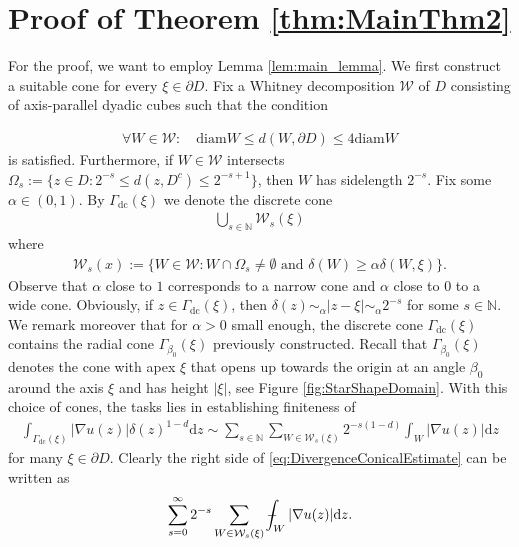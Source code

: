 \documentclass[a4paper,12pt]{article}
\theoremstyle{definition}
\theoremstyle{definition}
\def\Xint#1{\mathchoice
	{\XXint\displaystyle\textstyle{#1}}%
	{\XXint\textstyle\scriptstyle{#1}}%
	{\XXint\scriptstyle\scriptscriptstyle{#1}}%
	{\XXint\scriptscriptstyle\scriptscriptstyle{#1}}%
	\!\int}
\def\XXint#1#2#3{{\setbox0=\hbox{$#1{#2#3}{\int}$ }
		\vcenter{\hbox{$#2#3$ }}\kern-.568\wd0}}
\def\dashint{\Xint-}
\begin{document}
	\section{Proof of Theorem \ref{thm:MainThm2}}\label{sec:ConVar}
	For the proof, we want to employ Lemma \ref{lem:main_lemma}. We first construct a suitable cone for every $\xi\in\partial D$.  Fix a Whitney decomposition $\mathcal{W}$ of $D$ consisting of axis-parallel dyadic cubes such that the condition
	
	\begin{align}\label{eq:Whitney}
		\forall W\in\mathcal{W}:\quad \text{diam}W\leq d(W,\partial D)\leq 4\text{diam} W
	\end{align}
	is satisfied. Furthermore, if $W\in\mathcal{W}$ intersects $\Omega_s:=\lbrace z\in D:2^{-s}\leq d(z,D^c)\leq 2^{-s+1}\rbrace$, then $W$ has sidelength $2^{-s}$. Fix some  $\alpha\in(0,1)$. By $\Gamma_{\mathrm{dc}}(\xi)$ we denote the discrete cone
	\begin{align*}
		\bigcup_{s\in\mathbb N}\mathcal W_s(\xi)
	\end{align*}
	where
	\begin{align*}
		\mathcal{W}_s(x):=\lbrace W  \in \mathcal{W}: W\cap\Omega_s\neq\emptyset\text{ and }\delta(W)\geq\alpha\delta(W,\xi)\rbrace. 
	\end{align*}
	Observe that $\alpha$ close to $1$ corresponds to a narrow cone and $\alpha$ close to $0$ to a wide cone. Obviously, if $z\in\Gamma_{\mathrm{dc}}(\xi)$, then $\delta(z)\sim_\alpha |z-\xi|\sim_\alpha2^{-s}$ for some $s\in\mathbb N$. We remark moreover that for $\alpha>0$ small enough, the discrete cone $\Gamma_{\mathrm{dc}}(\xi)$ contains the radial cone $\Gamma_{\beta_0}(\xi)$ previously constructed. Recall that $\Gamma_{\beta_0}(\xi)$ denotes the cone with apex $\xi$ that opens up towards the origin at an angle $\beta_0$ around the axis $\xi$ and has height $|\xi|$, see Figure \ref{fig:StarShapeDomain}. With this choice of cones, the tasks lies in establishing finiteness of
	\begin{align}\label{eq:DivergenceConicalEstimate}
		\int_{\Gamma_{\mathrm{dc}}(\xi)}|\nabla u(z)|\delta(z)^{1-d} \mathrm dz\sim\sum_{s\in\mathbb N}\sum_{W\in\mathcal W_s(\xi)}2^{-s(1-d)}\int_W|\nabla u(z)|\mathrm dz
	\end{align}
	for many $\xi\in\partial D$. Clearly the right side of \eqref{eq:DivergenceConicalEstimate} can be written as
	\begin{align}\label{eq:discreteConicalVar}
		\sum_{s=0}^{\infty}2^{-s}\sum_{W\in\mathcal{W}_s(\xi)}\dashint_W|\nabla u(z)|\mathrm{d}z.
	\end{align}
\end{document}

